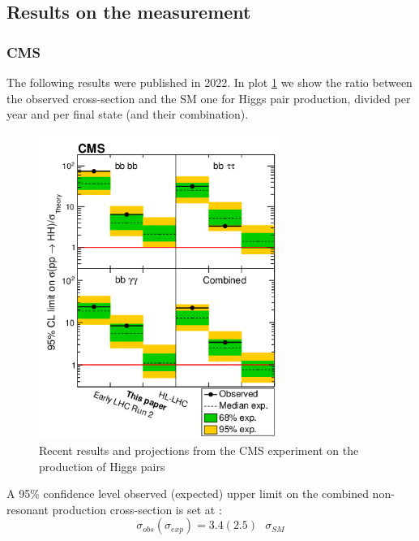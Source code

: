
\subsection{Results on the measurement}
\subsubsection{CMS}
The following results were published in 2022. In plot \ref{cms_results} we show the ratio between the observed cross-section and the SM one for Higgs pair production, divided per year and per final state (and their combination). \\
\begin{figure}[ht]
    \centering
        \includegraphics[width=0.7\textwidth]{images/cms_expected_HH_time.png}
        \caption{Recent results and projections from the CMS experiment on the production of Higgs pairs}
    \label{cms_results}  
\end{figure}
A 95\% confidence level observed (expected) upper limit on the combined non-resonant production cross-section is set at \cite{res_CMS_combined}:
\begin{equation}
    \sigma_{obs} \left(\sigma_{exp}\right) = 3.4 (2.5)\text{  }\sigma_{SM}
\end{equation}

